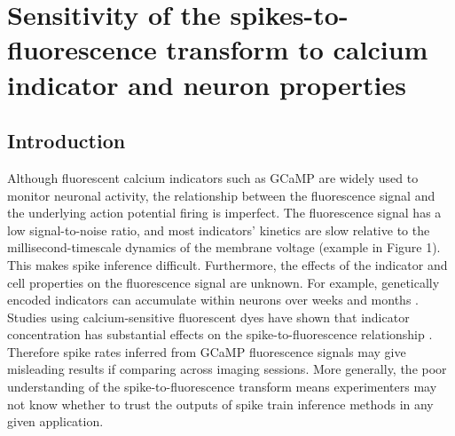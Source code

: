 
\chapter{Sensitivity of the spikes-to-fluorescence transform to calcium indicator and neuron properties} %

\label{chap:calcium} %


\section{Introduction}
Although fluorescent calcium indicators such as GCaMP are widely used to monitor neuronal activity, the relationship between the fluorescence signal and the underlying action potential firing is imperfect. The fluorescence signal has a low signal-to-noise ratio, and most indicators' kinetics are slow relative to the millisecond-timescale dynamics of the membrane voltage (example in Figure 1). This makes spike inference difficult. Furthermore, the effects of the indicator and cell properties on the fluorescence signal are unknown. For example, genetically encoded indicators can accumulate within neurons over weeks and months  \parencite{chen}. Studies using calcium-sensitive fluorescent dyes have shown that indicator concentration has substantial effects on the spike-to-fluorescence relationship  \parencite{maravall}. Therefore spike rates inferred from GCaMP fluorescence signals may give misleading results if comparing across imaging sessions. More generally, the poor understanding of the spike-to-fluorescence transform means experimenters may not know whether to trust the outputs of spike train inference methods in any given application.

